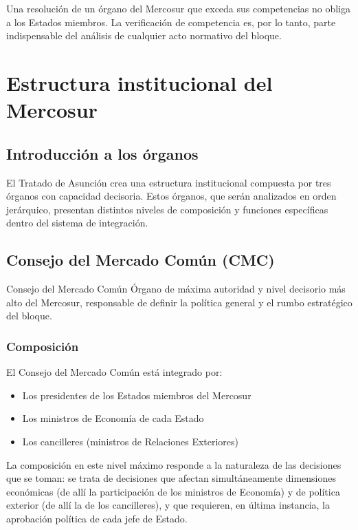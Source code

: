 \documentclass[12pt,oneside]{book}
\begin{document}
\begin{important}
Una resolución de un órgano del Mercosur que exceda sus competencias no obliga a los Estados miembros. La verificación de competencia es, por lo tanto, parte indispensable del análisis de cualquier acto normativo del bloque.
\end{important}

\chapter{Estructura institucional del Mercosur}

\section{Introducción a los órganos}

El Tratado de Asunción crea una estructura institucional compuesta por tres órganos con capacidad decisoria. Estos órganos, que serán analizados en orden jerárquico, presentan distintos niveles de composición y funciones específicas dentro del sistema de integración.

\section{Consejo del Mercado Común (CMC)}

\begin{definition}{Consejo del Mercado Común}
Órgano de máxima autoridad y nivel decisorio más alto del Mercosur, responsable de definir la política general y el rumbo estratégico del bloque.
\end{definition}

\subsection{Composición}

El Consejo del Mercado Común está integrado por:

\begin{itemize}
\item Los presidentes de los Estados miembros del Mercosur
\item Los ministros de Economía de cada Estado
\item Los cancilleres (ministros de Relaciones Exteriores)
\end{itemize}

La composición en este nivel máximo responde a la naturaleza de las decisiones que se toman: se trata de decisiones que afectan simultáneamente dimensiones económicas (de allí la participación de los ministros de Economía) y de política exterior (de allí la de los cancilleres), y que requieren, en última instancia, la aprobación política de cada jefe de Estado.
\end{document}
